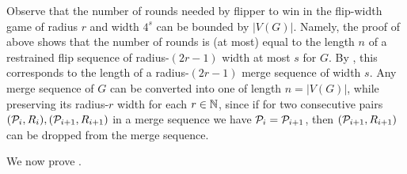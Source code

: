 \begin{remark}\label{rem:duration}
    Observe that the number of rounds needed by flipper to win in the flip-width game of radius $r$ and width $4^s$ can be bounded by $|V(G)|$.
    Namely, the proof of  above shows that 
    the number of rounds is (at most) equal to the length $n$ of a restrained flip sequence 
     of radius-$(2r-1)$ width at most \(s\) for $G$.
     By , this corresponds to the length of a radius-$(2r-1)$ merge sequence of width $s$. Any merge sequence of $G$ can be converted into one of length $n=|V(G)|$, while preserving its radius-$r$ width for each $r\in\N$, since if for two consecutive pairs $(\cal P_i, R_i),(\cal P_{i+1},R_{i+1})$ in a merge sequence we have $\cal P_i=\cal P_{i+1}$, then $(\cal P_{i+1},R_{i+1})$ can be dropped from the merge sequence.
\end{remark}

We now prove . 




